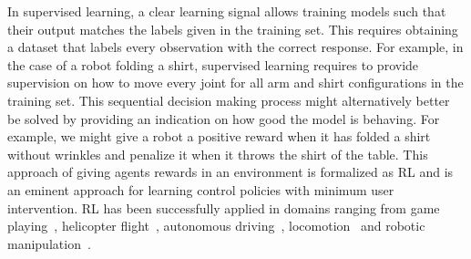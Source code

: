 \documentclass[\home/main.tex]{subfiles}
\begin{document}


In supervised learning, a clear learning signal allows training models such that their output matches the labels given in the training set. This requires obtaining a dataset that labels every observation with the correct response. For example, in the case of a robot folding a shirt, supervised learning requires to provide supervision on how to move every joint for all arm and shirt configurations in the training set. This sequential decision making process might alternatively better be solved by providing an indication on how good the model is behaving. For example, we might give a robot a positive reward when it has folded a shirt without wrinkles and penalize it when it throws the shirt of the table. This approach of giving agents rewards in an environment is formalized as \gls{RL} and is an eminent approach for learning control policies with minimum user intervention. RL has been successfully applied in domains ranging from game playing~\autocite{mnih2015human}, helicopter flight~\autocite{ng2003autonomous}, autonomous driving~\autocite{sallab2017deep}, locomotion~\autocite{tan2018sim} and robotic manipulation~\autocite{levine2016end}.
\end{document}
